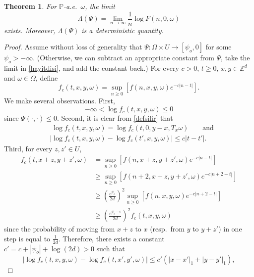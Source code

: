 \documentclass[a4paper]{amsart}
\numberwithin{equation}{section}
\theoremstyle{plain}
\newtheorem{theorem}{\sc Theorem}[section]
\theoremstyle{remark}
\begin{document}
\begin{theorem}\label{pargoz}
	For $\mathbb{P}$-a.e.\ $\omega$, the limit
	\begin{equation}\label{hayitdisi}
	\Lambda(\Psi) = \lim_{n\to\infty}\frac1{n}\log F(n,0,\omega)
	\end{equation}
	exists. Moreover, $\Lambda(\Psi)$ is a deterministic quantity.
\end{theorem}

\begin{proof}
	Assume without loss of generality that $\Psi:\Omega\times U\to[\psi_o,0]$ for some $\psi_o>-\infty$. (Otherwise, we can subtract an appropriate constant from $\Psi$, take the limit in \eqref{hayitdisi}, and add the constant back.)
	For every $c>0$, $t\ge0$, $x,y\in\mathbb{Z}^d$ and $\omega\in\Omega$, define
	\begin{equation}\label{defsifir}
	f_c(t,x,y,\omega) = \sup_{n\ge0}\left[f(n,x,y,\omega)e^{-c|n-t|}\right].
	\end{equation}
	We make several observations. First,
	\begin{equation}\label{ob1}
	-\infty<\log f_c(t,x,y,\omega) \le 0
	\end{equation}
	since $\Psi(\cdot,\cdot) \le 0$. Second, it is clear from \eqref{defsifir} that
	\begin{align}
	&\;\log f_c(t,x,y,\omega) = \log f_c(t,0,y-x,T_x\omega)\qquad\text{and}\label{ob2a}\\
	&|\log f_c(t,x,y,\omega) - \log f_c(t',x,y,\omega)| \le c|t - t'|.\label{ob2b}
	\end{align}
	Third, for every $z,z'\in U$,
	\begin{align*}
	f_c(t,x+z,y+z',\omega) &= \sup_{n\ge0}\left[f(n,x+z,y+z',\omega)e^{-c|n-t|}\right]\\
	&\ge \sup_{n\ge0}\left[f(n+2,x+z,y+z',\omega)e^{-c|n+2-t|}\right]\\
	&\ge \left(\frac{e^{\psi_o}}{2d}\right)^2\sup_{n\ge0}\left[f(n,x,y,\omega)e^{-c|n+2-t|}\right]\\
	&\ge \left(\frac{e^{\psi_o-c}}{2d}\right)^2f_c(t,x,y,\omega)
	\end{align*}
	since the probability of moving from $x+z$ to $x$ (resp.\ from $y$ to $y+z'$) in one step is equal to $\frac1{2d}$. 
	Therefore, there exists a constant $c' = c + |\psi_o| + \log(2d) > 0$ such that
	\begin{equation}\label{ob3}
	|\log f_c(t,x,y,\omega) - \log f_c(t,x',y',\omega)| \le c'\left(|x - x'|_1 + |y - y'|_1\right),
	\end{equation}

\end{proof}
\end{document}
